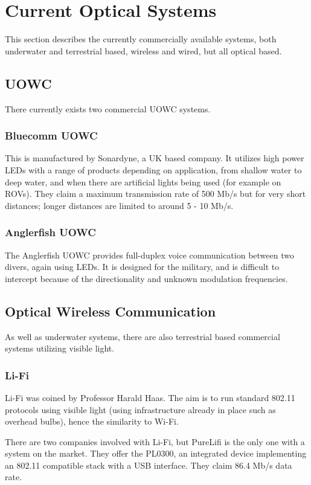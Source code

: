 \section{Current Optical Systems}
This section describes the currently commercially available systems, both
underwater and terrestrial based, wireless and wired, but all optical based.

\subsection{\ac{UOWC}}
There currently exists two commercial \ac{UOWC} systems.

\subsubsection{Bluecomm \ac{UOWC}}
This is manufactured by Sonardyne, a UK based company. It utilizes high power
\ac{LED}s with a range of products depending on application, from shallow water
to deep water, and when there are artificial lights being used (for example on
\ac{ROV}s). They claim a maximum transmission rate of 500 Mb/s but for very
short distances; longer distances are limited to around 5 - 10 Mb/s.

\subsubsection{Anglerfish \ac{UOWC}}
The Anglerfish \ac{UOWC} provides full-duplex voice communication between two
divers, again using \ac{LED}s. It is designed for the military, and is
difficult to intercept because of the directionality and unknown modulation
frequencies.

\subsection{Optical Wireless Communication}
As well as underwater systems, there are also terrestrial based commercial
systems utilizing visible light.

\subsubsection{Li-Fi}
Li-Fi was coined by Professor Harald Haas. The aim is to run standard 802.11
protocols using visible light (using infrastructure already in place such as
overhead bulbs), hence the similarity to Wi-Fi.

There are two companies involved with Li-Fi, but PureLifi is the only one with
a system on the market. They offer the PL0300, an integrated device
implementing an 802.11 compatible stack with a USB interface. They claim
86.4 Mb/s data rate.

